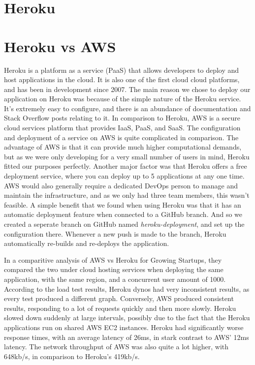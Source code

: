 \section{Heroku}

\section{Heroku vs AWS}

Heroku is a platform as a service (PaaS) that allows developers to deploy and host applications in the cloud. It is also one of the first cloud cloud platforms, and has been in development since 2007. The main reason we chose to deploy our application on Heroku was because of the simple nature of the Heroku service. It's extremely easy to configure, and there is an abundance of documentation and Stack Overflow posts relating to it. In comparison to Heroku, AWS is a secure cloud services platform that provides IaaS, PaaS, and SaaS. The configuration and deployment of a service on AWS is quite complicated in comparison. The advantage of AWS is that it can provide much higher computational demands, but as we were only developing for a very small number of users in mind, Heroku fitted our purposes perfectly. Another major factor was that Heroku offers a free deployment service, where you can deploy up to 5 applications at any one time. AWS would also generally require a dedicated DevOps person to manage and maintain the infrastructure, and as we only had three team members, this wasn't feasible. A simple benefit that we found when using Heroku was that it has an automatic deployment feature when connected to a GitHub branch. And so we created a seperate branch on GitHub named \textit{heroku-deployment}, and set up the configuration there. Whenever a new push is made to the branch, Heroku automatically re-builds and re-deploys the application.

In a comparitive analysis of AWS vs Heroku for Growing Startups, they compared the two under cloud hosting services when deploying the same application, with the same region, and a concurrent user amount of 1000. According to the load test results, Heroku dynos had very inconsistent results, as every test produced a different graph.
Conversely, AWS produced consistent results, responding	to a lot of requests quickly and then more slowly. Heroku slowed down suddenly at large intervals, possibly due to the fact that the Heroku applications run on shared AWS EC2 instances. Heroku had significantly worse response times, with an average latency of 26ms, in stark contrast to AWS' 12ms latency. The network throughput of AWS was also quite a lot higher, with 648kb/s, in comparison to Heroku's 419kb/s\cite{stapper2017analysis}.

